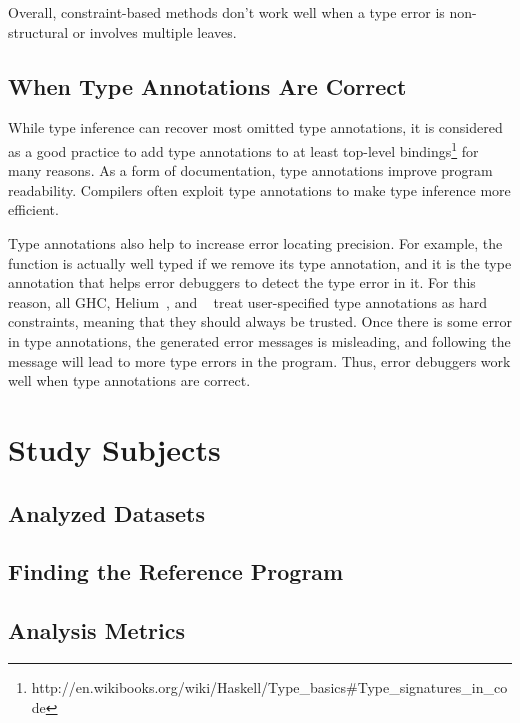 \documentclass[12pt]{report}	%
\begin{document}
Overall, constraint-based methods don't work well when a type
error is non-structural or involves multiple leaves.

\section{When Type Annotations Are Correct}
\label{sec:background:annotations}

While type inference can recover most omitted
type annotations, it is considered as a good
practice to add type annotations to at least
top-level bindings\footnote{http://en.wikibooks.org/wiki/Haskell/Type\_basics\#Type\_signatures\_in\_code}
for many reasons. As a form of documentation, type annotations improve
program readability. Compilers often exploit type annotations
to make type inference more efficient.

Type annotations also help to increase error
locating precision. For example,
the function  is
actually well typed if we remove its type annotation,
and it is the type annotation that helps error debuggers to detect
the type error in it. For this reason,
all GHC, Helium~\cite{Heeren03:HLH,Heeren05:TQT},
and \toolMin~\cite{Pavlinovic14:FMT,Pavlinovic15:PST}
treat user-specified type annotations as hard
constraints, meaning that they should always be trusted.
Once there is some error in type annotations, the
generated error messages is misleading, and following the
message will lead to more type errors in the program.
Thus, error debuggers work well when type annotations
are correct.

\chapter{Study Subjects}
\label{sec:subjects}

\section{Analyzed Datasets}
\label{sec:subjects:db}

\section{Finding the Reference Program}
\label{sec:subject:ref}

\section{Analysis Metrics}
\label{sec:subject:metric}
\end{document}
